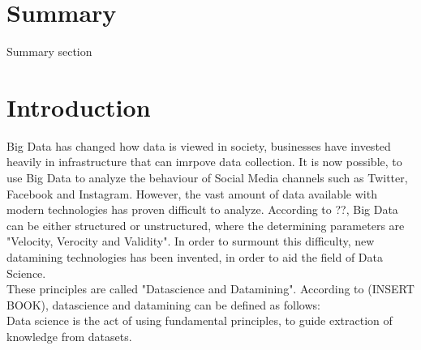 \documentclass{article}
\begin{document}
\color{NavyBlue} \tableofcontents \color{black}
\thispagestyle{empty} %
 \cleardoublepage
\setcounter{page}{1}%


\cleardoublepage%


\section{Summary} %
Summary section


\cleardoublepage %



















\color{NavyBlue} \section{Introduction} \label{sec:intro}

\color {black}

Big Data has changed how data is viewed in society, businesses have  invested heavily in infrastructure that can imrpove data collection.
It is now possible, to use Big Data to analyze the behaviour of Social Media channels such as Twitter, Facebook and Instagram. 
However, the vast amount of data available with modern technologies has proven difficult to analyze. According to ??, Big Data can be either
structured or unstructured, where the determining parameters are "Velocity, Verocity and Validity". In order to surmount  this difficulty, new datamining technologies 
has been invented, in order to aid the field of Data Science. \\

These principles are called "Datascience and Datamining". According to (INSERT BOOK), datascience and datamining can be defined as follows: \\

Data science is the act of using fundamental principles, to guide extraction of knowledge from datasets. \\
\end{document}
